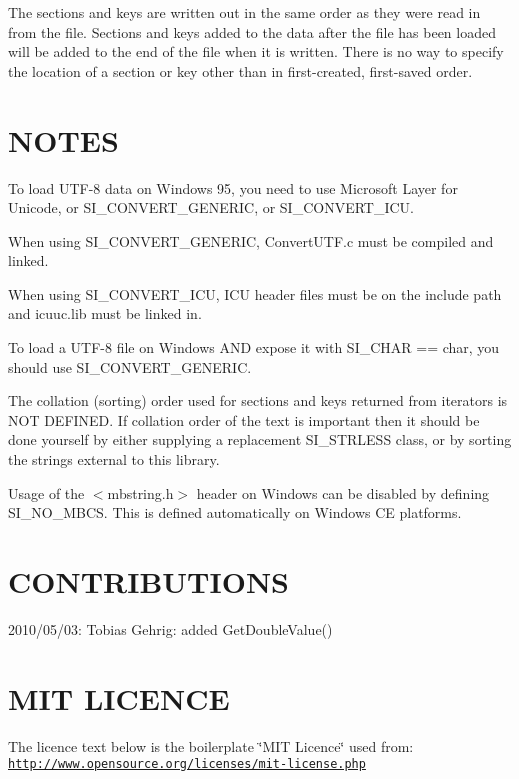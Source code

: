 The sections and keys are written out in the same order as they were read in from the file. Sections and keys added to the data after the file has been loaded will be added to the end of the file when it is written. There is no way to specify the location of a section or key other than in first-\/created, first-\/saved order.\hypertarget{index_notes}{}\section{N\+O\+T\+ES}\label{index_notes}

\begin{DoxyItemize}
\item To load U\+T\+F-\/8 data on Windows 95, you need to use Microsoft Layer for Unicode, or S\+I\+\_\+\+C\+O\+N\+V\+E\+R\+T\+\_\+\+G\+E\+N\+E\+R\+IC, or S\+I\+\_\+\+C\+O\+N\+V\+E\+R\+T\+\_\+\+I\+CU.
\item When using S\+I\+\_\+\+C\+O\+N\+V\+E\+R\+T\+\_\+\+G\+E\+N\+E\+R\+IC, Convert\+U\+T\+F.\+c must be compiled and linked.
\item When using S\+I\+\_\+\+C\+O\+N\+V\+E\+R\+T\+\_\+\+I\+CU, I\+CU header files must be on the include path and icuuc.\+lib must be linked in.
\item To load a U\+T\+F-\/8 file on Windows A\+ND expose it with S\+I\+\_\+\+C\+H\+AR == char, you should use S\+I\+\_\+\+C\+O\+N\+V\+E\+R\+T\+\_\+\+G\+E\+N\+E\+R\+IC.
\item The collation (sorting) order used for sections and keys returned from iterators is N\+OT D\+E\+F\+I\+N\+ED. If collation order of the text is important then it should be done yourself by either supplying a replacement S\+I\+\_\+\+S\+T\+R\+L\+E\+SS class, or by sorting the strings external to this library.
\item Usage of the $<$mbstring.\+h$>$ header on Windows can be disabled by defining S\+I\+\_\+\+N\+O\+\_\+\+M\+B\+CS. This is defined automatically on Windows CE platforms.
\end{DoxyItemize}\hypertarget{index_contrib}{}\section{C\+O\+N\+T\+R\+I\+B\+U\+T\+I\+O\+NS}\label{index_contrib}

\begin{DoxyItemize}
\item 2010/05/03\+: Tobias Gehrig\+: added Get\+Double\+Value()
\end{DoxyItemize}\hypertarget{index_licence}{}\section{M\+I\+T L\+I\+C\+E\+N\+CE}\label{index_licence}
The licence text below is the boilerplate \char`\"{}\+M\+I\+T Licence\char`\"{} used from\+: \href{http://www.opensource.org/licenses/mit-license.php}{\tt http\+://www.\+opensource.\+org/licenses/mit-\/license.\+php}

